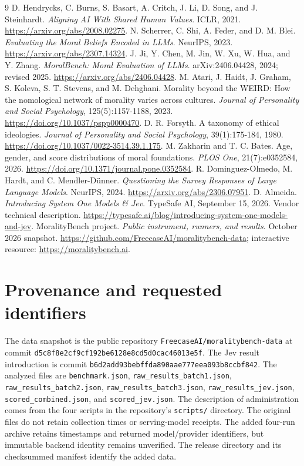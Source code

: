 \documentclass[11pt]{article}
\begin{document}
\begin{thebibliography}{9}
 D. Hendrycks, C. Burns, S. Basart, A. Critch, J. Li, D. Song, and J. Steinhardt. \emph{Aligning AI With Shared Human Values}. ICLR, 2021. \url{https://arxiv.org/abs/2008.02275}.
 N. Scherrer, C. Shi, A. Feder, and D. M. Blei. \emph{Evaluating the Moral Beliefs Encoded in LLMs}. NeurIPS, 2023. \url{https://arxiv.org/abs/2307.14324}.
 J. Ji, Y. Chen, M. Jin, W. Xu, W. Hua, and Y. Zhang. \emph{MoralBench: Moral Evaluation of LLMs}. arXiv:2406.04428, 2024; revised 2025. \url{https://arxiv.org/abs/2406.04428}.
 M. Atari, J. Haidt, J. Graham, S. Koleva, S. T. Stevens, and M. Dehghani. Morality beyond the WEIRD: How the nomological network of morality varies across cultures. \emph{Journal of Personality and Social Psychology}, 125(5):1157-1188, 2023. \url{https://doi.org/10.1037/pspp0000470}.
 D. R. Forsyth. A taxonomy of ethical ideologies. \emph{Journal of Personality and Social Psychology}, 39(1):175-184, 1980. \url{https://doi.org/10.1037/0022-3514.39.1.175}.
 M. Zakharin and T. C. Bates. Age, gender, and score distributions of moral foundations. \emph{PLOS One}, 21(7):e0352584, 2026. \url{https://doi.org/10.1371/journal.pone.0352584}.
 R. Dominguez-Olmedo, M. Hardt, and C. Mendler-D\"unner. \emph{Questioning the Survey Responses of Large Language Models}. NeurIPS, 2024. \url{https://arxiv.org/abs/2306.07951}.
 D. Almeida. \emph{Introducing System One Models \& Jev}. TypeSafe AI, September 15, 2026. Vendor technical description. \url{https://typesafe.ai/blog/introducing-system-one-models-and-jev}.
 MoralityBench project. \emph{Public instrument, runners, and results}. October 2026 snapshot. \url{https://github.com/FreecaseAI/moralitybench-data}; interactive resource: \url{https://moralitybench.ai}.
\end{thebibliography}

\appendix
\section{Provenance and requested identifiers}\label{app:provenance}
The data snapshot is the public repository \texttt{FreecaseAI/moralitybench-data} at commit \texttt{{d5c8f8e2cf9cf192be6128e8cd5d0cac46013e5f}}. The Jev result introduction is commit \texttt{{b6d2add93bebffda890aae777eea093b8ccbf842}}. The analyzed files are \texttt{benchmark.json}, \texttt{raw\_results\_batch1.json}, \texttt{raw\_results\_batch2.json}, \texttt{raw\_results\_batch3.json}, \texttt{raw\_results\_jev.json}, \texttt{scored\_combined.json}, and \texttt{scored\_jev.json}. The description of administration comes from the four scripts in the repository's \texttt{scripts/} directory. The original files do not retain collection times or serving-model receipts. The added four-run archive retains timestamps and returned model/provider identifiers, but immutable backend identity remains unverified. The release directory and its checksummed manifest identify the added data.
\end{document}
